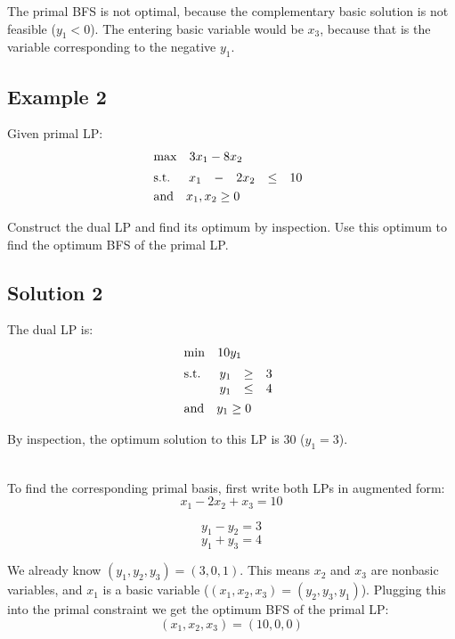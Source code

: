\documentclass[12pt]{article}
\begin{document}
\noindent
The primal BFS is not optimal, because the complementary basic solution is not feasible ($y_1 < 0$).
The entering basic variable would be $x_3$, because that is the variable corresponding to the negative $y_1$.

\newpage
\subsection*{Example 2}
Given primal LP:
\begin{align*}
    &\mathrm{max} \quad 3x_1 - 8x_2 \\[2pt]
    &\mathrm{s.t.} \quad 
    \begin{array}[t]{r c r c r}
        x_1 & - & 2x_2 & \leq & 10
    \end{array}\\
    &\mathrm{and} \quad x_1, x_2 \geq 0
\end{align*}

\noindent
Construct the dual LP and find its optimum by inspection.
Use this optimum to find the optimum BFS of the primal LP.

\subsection*{Solution 2}
The dual LP is:
\begin{align*}
    &\mathrm{min} \quad 10y_1 \\[2pt]
    &\mathrm{s.t.} \quad 
    \begin{array}[t]{r c r}
        y_1 & \geq & 3 \\
        y_1 & \leq & 4
    \end{array}\\
    &\mathrm{and} \quad y_1 \geq 0
\end{align*}

\noindent
By inspection, the optimum solution to this LP is 30 ($y_1 = 3$).

\noindent
\\
To find the corresponding primal basis, first write both LPs in augmented form:
\[ x_1 - 2x_2 + x_3 = 10 \]

\[ y_1 - y_2 = 3 \]
\[ y_1 + y_3 = 4 \]

\noindent
We already know $(y_1, y_2, y_3) = (3, 0, 1)$.
This means $x_2$ and $x_3$ are nonbasic variables, and $x_1$ is a basic variable ($(x_1, x_2, x_3) = (y_2, y_3, y_1)$).
Plugging this into the primal constraint we get the optimum BFS of the primal LP:
\[ (x_1, x_2, x_3) = (10, 0, 0) \]
\end{document}
